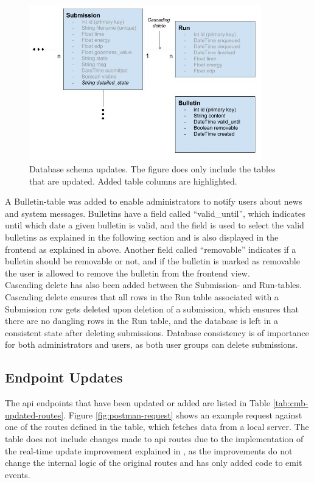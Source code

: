 \begin{figure}
    \includegraphics[width=0.9\textwidth]{figs/updated_database_schema.jpg}
    \caption[Database schema updates]{Database schema updates. The figure does only include the tables that are updated. Added table columns are highlighted.}
    \label{fig:updated-database-schema}
\end{figure}

A Bulletin-table was added to enable administrators to notify users about news and system messages. Bulletins have a field called ``valid\_until'', which indicates until which date a given bulletin is valid, and the field is used to select the valid bulletins as explained in the following section and is also displayed in the frontend as explained in  above. Another field called ``removable'' indicates if a bulletin should be removable or not, and if the bulletin is marked as removable the user is allowed to remove the bulletin from the frontend view. \\

Cascading delete has also been added between the Submission- and Run-tables. Cascading delete ensures that all rows in the Run table associated with a Submission row gets deleted upon deletion of a submission, which ensures that there are no dangling rows in the Run table, and the database is left in a consistent state after deleting submissions. Database consistency is of importance for both administrators and users, as both user groups can delete submissions.

\subsection{Endpoint Updates}
\label{sub-sec:impr-server-endpoint}
The \gls{api} endpoints that have been updated or added are listed in Table \ref{tab:cmb-updated-routes}. Figure \ref{fig:postman-request} shows an example request against one of the routes defined in the table, which fetches data from a local server. The table does not include changes made to \gls{api} routes due to the implementation of the real-time update improvement explained in , as the improvements do not change the internal logic of the original routes and has only added code to emit events. \\

